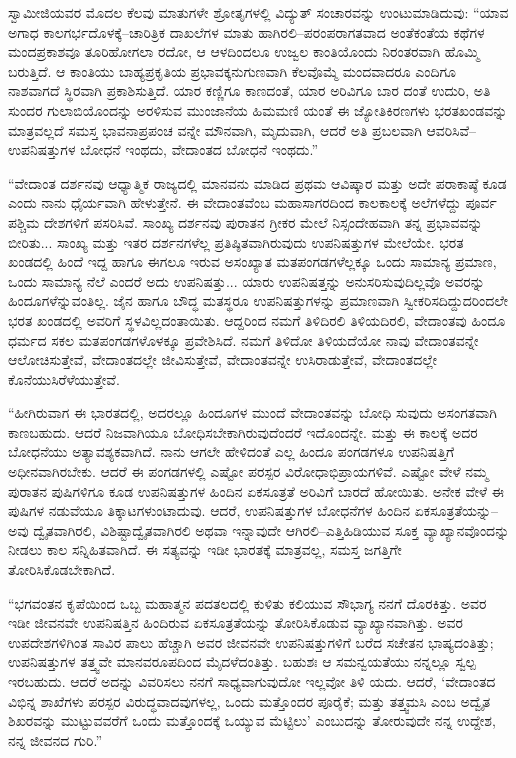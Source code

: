 ಸ್ವಾಮೀಜಿಯವರ ಮೊದಲ ಕೆಲವು ಮಾತುಗಳೇ ಶ್ರೋತೃಗಳಲ್ಲಿ ವಿದ್ಯುತ್ ಸಂಚಾರವನ್ನು ಉಂಟುಮಾಡಿದುವು: “ಯಾವ ಅಗಾಧ ಕಾಲಗರ್ಭದೊಳಕ್ಕೆ–ಚಾರಿತ್ರಿಕ ದಾಖಲೆಗಳ ಮಾತು ಹಾಗಿರಲಿ–ಪರಂಪರಾಗತವಾದ ಅಂತೆಕಂತೆಯ ಕಥೆಗಳ ಮಂದಪ್ರಕಾಶವೂ ತೂರಿಹೋಗಲಾ ರದೋ, ಆ ಆಳದಿಂದಲೂ ಉಜ್ವಲ ಕಾಂತಿಯೊಂದು ನಿರಂತರವಾಗಿ ಹೊಮ್ಮಿ ಬರುತ್ತಿದೆ. ಆ ಕಾಂತಿಯು ಬಾಹ್ಯಪ್ರಕೃತಿಯ ಪ್ರಭಾವಕ್ಕನುಗುಣವಾಗಿ ಕೆಲವೊಮ್ಮೆ ಮಂದವಾದರೂ ಎಂದಿಗೂ ನಾಶವಾಗದೆ ಸ್ಥಿರವಾಗಿ ಪ್ರಕಾಶಿಸುತ್ತಿದೆ. ಯಾರ ಕಣ್ಣಿಗೂ ಕಾಣದಂತೆ, ಯಾರ ಅರಿವಿಗೂ ಬಾರ ದಂತೆ ಉದುರಿ, ಅತಿ ಸುಂದರ ಗುಲಾಬಿಯೊಂದನ್ನು ಅರಳಿಸುವ ಮುಂಜಾನೆಯ ಹಿಮಮಣಿ ಯಂತೆ ಈ ಜ್ಯೋತಿಕಿರಣಗಳು ಭರತಖಂಡವನ್ನು ಮಾತ್ರವಲ್ಲದೆ ಸಮಸ್ತ ಭಾವನಾಪ್ರಪಂಚ ವನ್ನೇ ಮೌನವಾಗಿ, ಮೃದುವಾಗಿ, ಆದರೆ ಅತಿ ಪ್ರಬಲವಾಗಿ ಆವರಿಸಿವೆ–ಉಪನಿಷತ್ತುಗಳ ಬೋಧನೆ ಇಂಥದು, ವೇದಾಂತದ ಬೋಧನೆ ಇಂಥದು.”

“ವೇದಾಂತ ದರ್ಶನವು ಆಧ್ಯಾತ್ಮಿಕ ರಾಜ್ಯದಲ್ಲಿ ಮಾನವನು ಮಾಡಿದ ಪ್ರಥಮ ಆವಿಷ್ಕಾರ ಮತ್ತು ಅದೇ ಪರಾಕಾಷ್ಠೆ ಕೂಡ ಎಂದು ನಾನು ಧೈರ್ಯವಾಗಿ ಹೇಳುತ್ತೇನೆ. ಈ ವೇದಾಂತವೆಂಬ ಮಹಾಸಾಗರದಿಂದ ಕಾಲಕಾಲಕ್ಕೆ ಅಲೆಗಳೆದ್ದು ಪೂರ್ವ ಪಶ್ಚಿಮ ದೇಶಗಳಿಗೆ ಪಸರಿಸಿವೆ. ಸಾಂಖ್ಯ ದರ್ಶನವು ಪುರಾತನ ಗ್ರೀಕರ ಮೇಲೆ ನಿಸ್ಸಂದೇಹವಾಗಿ ತನ್ನ ಪ್ರಭಾವವನ್ನು ಬೀರಿತು... ಸಾಂಖ್ಯ ಮತ್ತು ಇತರ ದರ್ಶನಗಳೆಲ್ಲ ಪ್ರತಿಷ್ಠಿತವಾಗಿರುವುದು ಉಪನಿಷತ್ತುಗಳ ಮೇಲೆಯೇ. ಭರತ ಖಂಡದಲ್ಲಿ ಹಿಂದೆ ಇದ್ದ ಹಾಗೂ ಈಗಲೂ ಇರುವ ಅಸಂಖ್ಯಾತ ಮತಪಂಗಡಗಳೆಲ್ಲಕ್ಕೂ ಒಂದು ಸಾಮಾನ್ಯ ಪ್ರಮಾಣ, ಒಂದು ಸಾಮಾನ್ಯ ನೆಲೆ ಎಂದರೆ ಅದು ಉಪನಿಷತ್ತು... ಯಾರು ಉಪನಿಷತ್ತನ್ನು ಅನುಸರಿಸುವುದಿಲ್ಲವೊ ಅವರನ್ನು ಹಿಂದೂಗಳೆನ್ನುವಂತಿಲ್ಲ. ಜೈನ ಹಾಗೂ ಬೌದ್ಧ ಮತಸ್ಥರೂ ಉಪನಿಷತ್ತುಗಳನ್ನು ಪ್ರಮಾಣವಾಗಿ ಸ್ವೀಕರಿಸದಿದ್ದುದರಿಂದಲೇ ಭರತ ಖಂಡದಲ್ಲಿ ಅವರಿಗೆ ಸ್ಥಳವಿಲ್ಲದಂತಾಯಿತು. ಆದ್ದರಿಂದ ನಮಗೆ ತಿಳಿದಿರಲಿ ತಿಳಿಯದಿರಲಿ, ವೇದಾಂತವು ಹಿಂದೂ ಧರ್ಮದ ಸಕಲ ಮತಪಂಗಡಗಳೊಳಕ್ಕೂ ಪ್ರವೇಶಿಸಿದೆ. ನಮಗೆ ತಿಳಿದೋ ತಿಳಿಯದೆಯೋ ನಾವು ವೇದಾಂತವನ್ನೇ ಆಲೋಚಿಸುತ್ತೇವೆ, ವೇದಾಂತದಲ್ಲೇ ಜೀವಿಸುತ್ತೇವೆ, ವೇದಾಂತವನ್ನೇ ಉಸಿರಾಡುತ್ತೇವೆ, ವೇದಾಂತದಲ್ಲೇ ಕೊನೆಯುಸಿರೆಳೆಯುತ್ತೇವೆ.

“ಹೀಗಿರುವಾಗ ಈ ಭಾರತದಲ್ಲಿ, ಅದರಲ್ಲೂ ಹಿಂದೂಗಳ ಮುಂದೆ ವೇದಾಂತವನ್ನು ಬೋಧಿ ಸುವುದು ಅಸಂಗತವಾಗಿ ಕಾಣಬಹುದು. ಆದರೆ ನಿಜವಾಗಿಯೂ ಬೋಧಿಸಬೇಕಾಗಿರುವುದೆಂದರೆ ಇದೊಂದನ್ನೇ. ಮತ್ತು ಈ ಕಾಲಕ್ಕೆ ಅದರ ಬೋಧನೆಯು ಅತ್ಯಾವಶ್ಯಕವಾಗಿದೆ. ನಾನು ಆಗಲೇ ಹೇಳಿದಂತೆ ಎಲ್ಲ ಹಿಂದೂ ಪಂಗಡಗಳೂ ಉಪನಿಷತ್ತಿಗೆ ಅಧೀನವಾಗಿರಬೇಕು. ಆದರೆ ಈ ಪಂಗಡಗಳಲ್ಲಿ ಎಷ್ಟೋ ಪರಸ್ಪರ ವಿರೋಧಾಭಿಪ್ರಾಯಗಳಿವೆ. ಎಷ್ಟೋ ವೇಳೆ ನಮ್ಮ ಪುರಾತನ ಪುಷಿಗಳಿಗೂ ಕೂಡ ಉಪನಿಷತ್ತುಗಳ ಹಿಂದಿನ ಏಕಸೂತ್ರತೆ ಅರಿವಿಗೆ ಬಾರದೆ ಹೋಯಿತು. ಅನೇಕ ವೇಳೆ ಈ ಪುಷಿಗಳ ನಡುವೆಯೂ ತಿಕ್ಕಾಟಗಳುಂಟಾದುವು. ಆದರೆ, ಉಪನಿಷತ್ತುಗಳ ಬೋಧನೆಗಳ ಹಿಂದಿನ ಏಕಸೂತ್ರತೆಯನ್ನು–ಅವು ದ್ವೈತವಾಗಿರಲಿ, ವಿಶಿಷ್ಟಾದ್ವೈತವಾಗಿರಲಿ ಅಥವಾ ಇನ್ನಾವುದೇ ಆಗಿರಲಿ–ಎತ್ತಿಹಿಡಿಯುವ ಸೂಕ್ತ ವ್ಯಾಖ್ಯಾನವೊಂದನ್ನು ನೀಡಲು ಕಾಲ ಸನ್ನಿಹಿತವಾಗಿದೆ. ಈ ಸತ್ಯವನ್ನು ಇಡೀ ಭಾರತಕ್ಕೆ ಮಾತ್ರವಲ್ಲ, ಸಮಸ್ತ ಜಗತ್ತಿಗೇ ತೋರಿಸಿಕೊಡಬೇಕಾಗಿದೆ.

“ಭಗವಂತನ ಕೃಪೆಯಿಂದ ಒಬ್ಬ ಮಹಾತ್ಮನ ಪದತಲದಲ್ಲಿ ಕುಳಿತು ಕಲಿಯುವ ಸೌಭಾಗ್ಯ ನನಗೆ ದೊರಕಿತ್ತು. ಅವರ ಇಡೀ ಜೀವನವೇ ಉಪನಿಷತ್ತಿನ ಹಿಂದಿರುವ ಏಕಸೂತ್ರತೆಯನ್ನು ತೋರಿಸಿಕೊಡುವ ವ್ಯಾಖ್ಯಾನವಾಗಿತ್ತು. ಅವರ ಉಪದೇಶಗಳಿಗಿಂತ ಸಾವಿರ ಪಾಲು ಹೆಚ್ಚಾಗಿ ಅವರ ಜೀವನವೇ ಉಪನಿಷತ್ತುಗಳಿಗೆ ಬರೆದ ಸಚೇತನ ಭಾಷ್ಯದಂತಿತ್ತು; ಉಪನಿಷತ್ತುಗಳ ತತ್ತ್ವವೇ ಮಾನವರೂಪದಿಂದ ಮೈದಳೆದಂತಿತ್ತು. ಬಹುಶಃ ಆ ಸಮನ್ವಯತೆಯು ನನ್ನಲ್ಲೂ ಸ್ವಲ್ಪ ಇರಬಹುದು. ಆದರೆ ಅದನ್ನು ವಿವರಿಸಲು ನನಗೆ ಸಾಧ್ಯವಾಗುವುದೋ ಇಲ್ಲವೋ ತಿಳಿ ಯದು. ಆದರೆ, ‘ವೇದಾಂತದ ವಿಭಿನ್ನ ಶಾಖೆಗಳು ಪರಸ್ಪರ ವಿರುದ್ಧವಾದವುಗಳಲ್ಲ, ಒಂದು ಮತ್ತೊಂದರ ಪೂರೈಕೆ; ಮತ್ತು ತತ್ತ್ವಮಸಿ ಎಂಬ ಅದ್ವೈತ ಶಿಖರವನ್ನು ಮುಟ್ಟುವವರೆಗೆ ಒಂದು ಮತ್ತೊಂದಕ್ಕೆ ಒಯ್ಯುವ ಮೆಟ್ಟಿಲು’ ಎಂಬುದನ್ನು ತೋರುವುದೇ ನನ್ನ ಉದ್ದೇಶ, ನನ್ನ ಜೀವನದ ಗುರಿ.”

